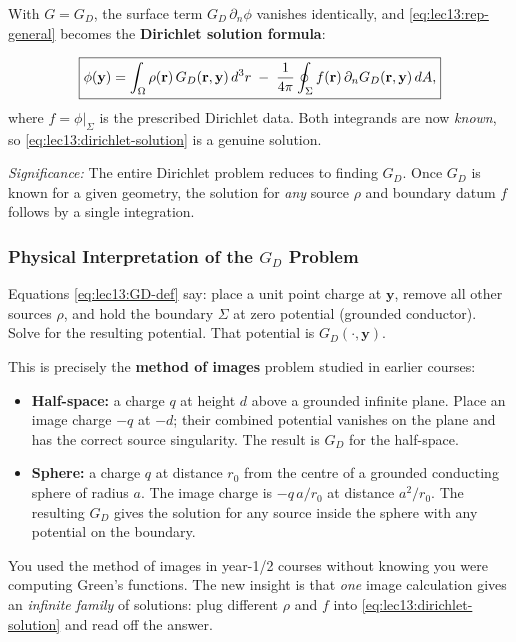 With $G = G_D$, the surface term $G_D\,\partial_n\phi$ vanishes identically, and
\eqref{eq:lec13:rep-general} becomes the \textbf{Dirichlet solution formula}:

\begin{equation}\label{eq:lec13:dirichlet-solution}
  \boxed{
    \phi(\mathbf{y})
    = \int_\Omega \rho(\mathbf{r})\, G_D(\mathbf{r},\mathbf{y})\, d^3r
    \;-\; \frac{1}{4\pi}\oint_\Sigma
    f(\mathbf{r})\,\partial_n G_D(\mathbf{r},\mathbf{y})\, dA,
  }
\end{equation}
where $f = \phi|_\Sigma$ is the prescribed Dirichlet data.  Both integrands are now
\emph{known}, so \eqref{eq:lec13:dirichlet-solution} is a genuine solution.

\textit{Significance:} The entire Dirichlet problem reduces to finding $G_D$.  Once $G_D$
is known for a given geometry, the solution for \emph{any} source $\rho$ and boundary
datum $f$ follows by a single integration.

\subsubsection*{Physical Interpretation of the $G_D$ Problem}
Equations \eqref{eq:lec13:GD-def} say: place a unit point charge at $\mathbf{y}$, remove
all other sources $\rho$, and hold the boundary $\Sigma$ at zero potential (grounded
conductor).  Solve for the resulting potential.  That potential is $G_D(\cdot,\mathbf{y})$.

This is precisely the \textbf{method of images} problem studied in earlier courses:
\begin{itemize}
  \item \textbf{Half-space:} a charge $q$ at height $d$ above a grounded infinite plane.
        Place an image charge $-q$ at $-d$; their combined potential vanishes on the plane
        and has the correct source singularity.  The result is $G_D$ for the half-space.
  \item \textbf{Sphere:} a charge $q$ at distance $r_0$ from the centre of a grounded
        conducting sphere of radius $a$.  The image charge is $-q\,a/r_0$ at distance
        $a^2/r_0$.  The resulting $G_D$ gives the solution for any source inside the sphere
        with any potential on the boundary.
\end{itemize}

\begin{remark}
  You used the method of images in year-1/2 courses without knowing you were computing
  Green's functions.  The new insight is that \emph{one} image calculation gives an
  \emph{infinite family} of solutions: plug different $\rho$ and $f$ into
  \eqref{eq:lec13:dirichlet-solution} and read off the answer.
\end{remark}

